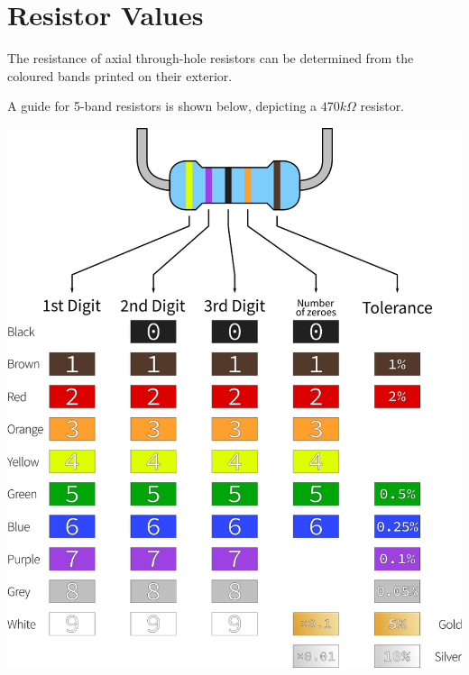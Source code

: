 \section{Resistor Values}

	The resistance of axial through-hole resistors can be determined from the coloured bands printed on their exterior.
	
	A guide for 5-band resistors is shown below, depicting a $470 k\Omega$ resistor.
	
	\begin{center}
		\includegraphics[width=0.7\linewidth]{McrRaspJam/015_GPIOZero/8_resistorbands/5band}
	\end{center}